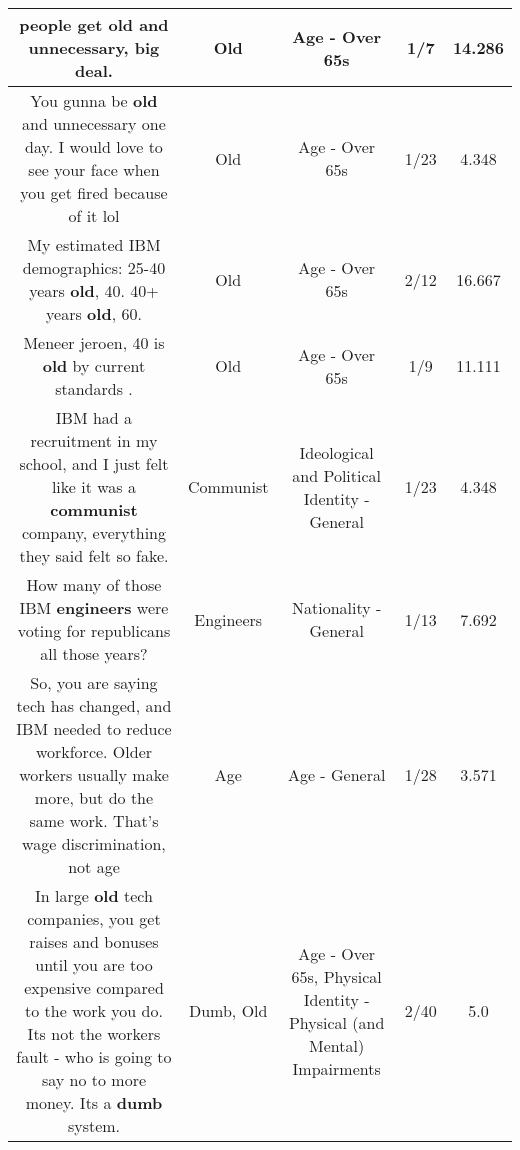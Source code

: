 \documentclass[11pt]{article}
\newlength\mylength
\begin{document}
\begin{center}
\begin{longtable}{|C{.65\mylength}|C{.30\mylength}|C{.12\mylength}|C{.12\mylength}|C{.12\mylength}|}
  \small people get \textbf{old} and unnecessary, big deal.\normalsize   & Old & Age - Over 65s & 1/7 & 14.286 \\  \hline
  \small You gunna be \textbf{old} and unnecessary one day.  I would love to see your face when you get fired because of it lol\normalsize   & Old & Age - Over 65s & 1/23 & 4.348 \\  \hline
  \small My estimated IBM demographics: 25-40 years \textbf{old}, 40. 40+ years \textbf{old}, 60.\normalsize   & Old & Age - Over 65s & 2/12 & 16.667 \\  \hline
  \small Meneer jeroen, 40 is \textbf{old} by current standards .\normalsize   & Old & Age - Over 65s & 1/9 & 11.111 \\  \hline
  \small IBM had a recruitment in my school, and I just felt like it was a \textbf{communist} company, everything they said felt so fake.\normalsize   & Communist &  Ideological and Political Identity - General & 1/23 & 4.348 \\  \hline
  \small How many of those IBM \textbf{engineers} were voting for republicans all those years?\normalsize   & Engineers & Nationality - General & 1/13 & 7.692 \\  \hline
  \small So, you are saying tech has changed, and IBM needed to reduce workforce. Older workers usually make more, but do the same work. That's wage discrimination, not age\normalsize   & Age & Age - General & 1/28 & 3.571 \\  \hline
  \small In large \textbf{old} tech companies, you get raises and bonuses until you are too expensive compared to the work you do. Its not the workers fault - who is going to say no to more money. Its a \textbf{dumb} system.\normalsize   & Dumb, Old & Age - Over 65s, Physical Identity - Physical (and Mental) Impairments & 2/40 & 5.0 \\  \hline

\end{longtable}
\end{center}
\end{document}
